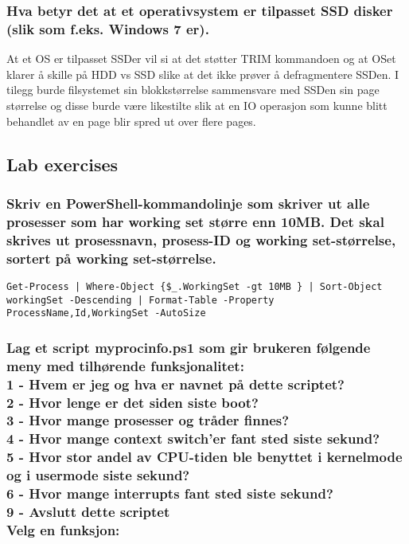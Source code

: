 \documentclass[11pt]{article}
\begin{document}
\subsubsection{Hva betyr det at et operativsystem er tilpasset SSD disker (slik som f.eks. Windows 7 er).}

At et OS er tilpasset SSDer vil si at det støtter TRIM kommandoen og at OSet klarer å skille på HDD vs SSD slike at det ikke prøver å defragmentere SSDen. I tilegg burde filsystemet sin blokkstørrelse sammensvare med SSDen sin page størrelse og disse burde være likestilte slik at en IO operasjon som kunne blitt behandlet av en page blir spred ut over flere pages.
\subsection{Lab exercises}
\subsubsection{Skriv en PowerShell-kommandolinje som skriver ut alle prosesser som har working set større enn 10MB. Det skal skrives ut prosessnavn, prosess-ID og working set-størrelse, sortert på working set-størrelse.}
\begin{lstlisting}[breaklines]
Get-Process | Where-Object {$_.WorkingSet -gt 10MB } | Sort-Object workingSet -Descending | Format-Table -Property ProcessName,Id,WorkingSet -AutoSize
\end{lstlisting}
\subsubsection{Lag et script myprocinfo.ps1 som gir brukeren følgende meny med tilhørende funksjonalitet: \\
1 - Hvem er jeg og hva er navnet på dette scriptet? \\
2 - Hvor lenge er det siden siste boot? \\
3 - Hvor mange prosesser og tråder finnes? \\
4 - Hvor mange context switch'er fant sted siste sekund? \\
5 - Hvor stor andel av CPU-tiden ble benyttet i kernelmode og i usermode siste sekund? \\
6 - Hvor mange interrupts fant sted siste sekund? \\
9 - Avslutt dette scriptet \\
Velg en funksjon:
}
\end{document}
